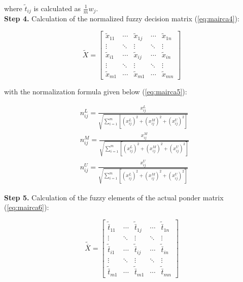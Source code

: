\noindent where $\tilde{t}_{ij}$ is calculated as $\frac{1}{m}w_{j}$. \\

\noindent \textbf{Step 4.} Calculation of the normalized fuzzy decision matrix (\ref{eq:mairca4}):

\begin{equation}
\tilde{X}=\left[\begin{array}{ccccc}
\tilde{x}_{11} & \cdots & \tilde{x}_{1 j} & \cdots & \tilde{x}_{1 n} \\
\vdots & \ddots & \vdots & \ddots & \vdots \\
\tilde{x}_{i 1} & \cdots & \tilde{x}_{i j} & \cdots & \tilde{x}_{i n} \\
\vdots & \ddots & \vdots & \ddots & \vdots \\
\tilde{x}_{m 1} & \cdots & \tilde{x}_{m 1} & \cdots & \tilde{x}_{m n}
\end{array}\right]
\label{eq:mairca4}
\end{equation}

\noindent with the normalization formula given below (\ref{eq:mairca5}):

\begin{equation}
\begin{aligned}
&n_{i j}^L=\frac{x_{i j}^L}{\sqrt{\sum_{i=1}^m\left[\left(x_{i j}^L\right)^2+\left(x_{i j}^M\right)^2+\left(x_{i j}^U\right)^2\right]}} \\
&n_{i j}^M=\frac{x_{i j}^M}{\sqrt{\sum_{i=1}^m\left[\left(x_{i j}^L\right)^2+\left(x_{i j}^M\right)^2+\left(x_{i j}^U\right)^2\right]}} \\
&n_{i j}^U=\frac{x_{i j}^U}{\sqrt{\sum_{i=1}^m\left[\left(x_{i j}^L\right)^2+\left(x_{i j}^M\right)^2+\left(x_{i j}^U\right)^2\right]}}
\end{aligned}
\label{eq:mairca5}
\end{equation}

\noindent \textbf{Step 5.} Calculation of the fuzzy elements of the actual ponder matrix (\ref{eq:mairca6}):

\begin{equation}
\tilde{\overline{X}}=\left[\begin{array}{ccccc}
\tilde{\bar{t}}_{11} & \cdots & \tilde{\bar{t}}_{1 j} & \cdots & \tilde{\bar{t}}_{1 n} \\
\vdots & \ddots & \vdots & \ddots & \vdots \\
\tilde{\bar{t}}_{i 1} & \cdots & \tilde{\bar{t}}_{i j} & \cdots & \tilde{\bar{t}}_{i n} \\
\vdots & \ddots & \vdots & \ddots & \vdots \\
\tilde{\bar{t}}_{m 1} & \cdots & \tilde{\bar{t}}_{m 1} & \cdots & \tilde{\bar{t}}_{m n}
\end{array}\right]
\label{eq:mairca6}
\end{equation}

